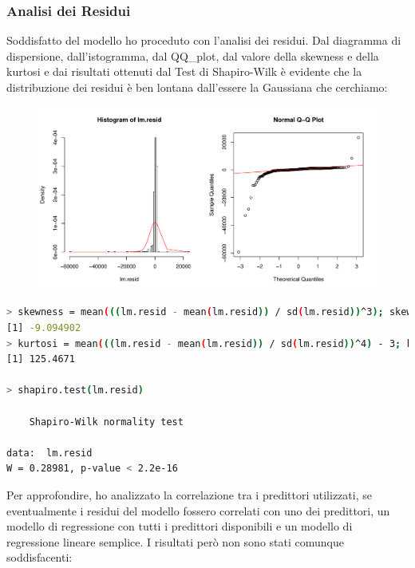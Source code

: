 \documentclass[11pt,a4paper]{article}
\begin{document}
\subsubsection{Analisi dei Residui}
Soddisfatto del modello ho proceduto con l'analisi dei residui. Dal diagramma di
dispersione, dall'istogramma, dal QQ\_plot, dal valore della skewness e della
kurtosi e dai risultati ottenuti dal Test di Shapiro-Wilk \`e evidente che la
distribuzione dei residui \`e ben lontana dall'essere la Gaussiana che
cerchiamo:
\clearpage
\begin{figure}[H]
	\vspace{-1cm}
	\hspace{-1.5cm}
	\includegraphics[scale=0.7]{imgs/residuals.pdf}
\end{figure}
\vspace{-0.8cm}
\begin{lstlisting}[language=bash,basicstyle=\tiny,tabsize=2,frame = single]
> skewness = mean(((lm.resid - mean(lm.resid)) / sd(lm.resid))^3); skewness
[1] -9.094902
> kurtosi = mean(((lm.resid - mean(lm.resid)) / sd(lm.resid))^4) - 3; kurtosi
[1] 125.4671

> shapiro.test(lm.resid)

	Shapiro-Wilk normality test

data:  lm.resid
W = 0.28981, p-value < 2.2e-16
\end{lstlisting}
\vspace{0.2cm}
Per approfondire, ho analizzato la correlazione tra i predittori utilizzati, se
eventualmente i residui del modello fossero correlati con uno dei predittori, un
modello di regressione con tutti i predittori disponibili e un modello di
regressione lineare semplice. I risultati per\`o non sono stati comunque
soddisfacenti:
\vspace{0.2cm}
\end{document}
